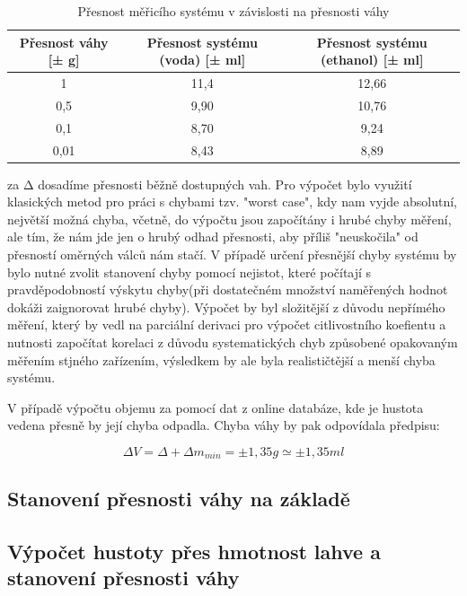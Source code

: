\begin{table}[H]
    \centering
    \begin{tabular}{|c|c|c|}
        \hline
        Přesnost váhy [± g] & Přesnost systému (voda) [± ml] & Přesnost systému (ethanol) [± ml]\\ \hline \hline
         1 & 11,4 & 12,66\\ \hline
         0,5 & 9,90 & 10,76\\ \hline
         0,1 & 8,70 & 9,24\\ \hline
         0,01 & 8,43 & 8,89\\ \hline
    \end{tabular}
    \caption{Přesnost měřicího systému v závislosti na přesnosti váhy}
    \label{tab:my_label}
\end{table}
za Δ dosadíme přesnosti běžně dostupných vah.
Pro výpočet bylo využití klasických metod pro práci s chybami tzv. "worst case", kdy nam vyjde absolutní, největší možná chyba, včetně, do výpočtu jsou započítány i hrubé chyby měření, ale tím, že nám jde jen o hrubý odhad přesnosti, aby příliš "neuskočila" od přesností oměrných válců nám stačí. V případě určení přesnější chyby systému by bylo nutné zvolit stanovení chyby pomocí nejistot, které počítají s pravděpodobností výskytu chyby(při dostatečném množství naměřených hodnot dokáži zaignorovat hrubé chyby). Výpočet by byl složitější z důvodu nepřímého měření, který by vedl na parciální derivaci pro výpočet citlivostního koefientu a nutnosti započítat korelaci z důvodu systematických chyb způsobené opakovaným měřením stjného zařízením, výsledkem by ale byla realističtější a menší chyba systému.

V případě výpočtu objemu za pomocí dat z online databáze, kde je hustota vedena přesně by její chyba odpadla. Chyba váhy by pak odpovídala předpisu:

\[\Delta V = \Delta + \Delta m_{min} = \pm 1,35 g \simeq \pm 1,35 ml\]




\subsection{Stanovení přesnosti váhy na základě }
\subsection{Výpočet hustoty přes hmotnost lahve a stanovení přesnosti váhy}

